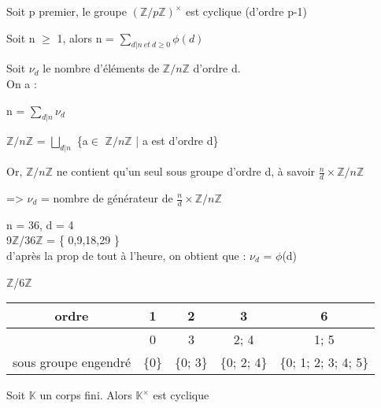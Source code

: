 \begin{prop}
	Soit p premier, le groupe $(\mathbb{Z}/p\mathbb{Z})^{\times}$ est cyclique (d'ordre p-1)
\end{prop}
\begin{lem}
	Soit n $\geq$ 1, alors n = $\sum_{d|n\ et\ d \geq 0} \phi(d)$
\end{lem}
\begin{dem}
	Soit $\nu_{d}$ le nombre d'éléments de $\mathbb{Z}/n\mathbb{Z}$ d'ordre d.\\
	On a :
	
	n = $\sum_{d|n} \nu_{d}$
	
	$\mathbb{Z}/n\mathbb{Z}$ = $\bigsqcup_{d|n}$ \{a$\in$ $\mathbb{Z}/n\mathbb{Z}$ | a est d'ordre d\}
	
	Or, $\mathbb{Z}/n\mathbb{Z}$ ne contient qu'un seul sous groupe d'ordre d, à savoir $\frac{n}{d}\times\mathbb{Z}/n\mathbb{Z}$
	
	=> $\nu_{d}$ = nombre de générateur de $\frac{n}{d}\times\mathbb{Z}/n\mathbb{Z}$
\end{dem}
\begin{ex}
	n = 36, d = 4 \\
	9$\mathbb{Z}$/36$\mathbb{Z}$ = \{ 0,9,18,29 \} \\
	d'après la prop de tout à l'heure, on obtient que : $\nu_{d}$ = $\phi$(d)
\end{ex}
\begin{ex}
	$\mathbb{Z}$/6$\mathbb{Z}$
	\begin{center}
		\begin{tabular}{|c|c|c|c|c|}
			\hline
			ordre & 1 & 2 & 3 & 6 \\
			\hline
			& 0 & 3 & 2; 4 & 1; 5\\
			\hline
			sous groupe engendré & \{0\} & \{0; 3\} & \{0; 2; 4\} & \{0; 1; 2; 3; 4; 5\}\\
			\hline
		\end{tabular}
	\end{center}
\end{ex}
\begin{prop}
	Soit $\mathbb{K}$ un corps fini. Alors $\mathbb{K}^{\times}$ est cyclique
\end{prop}
